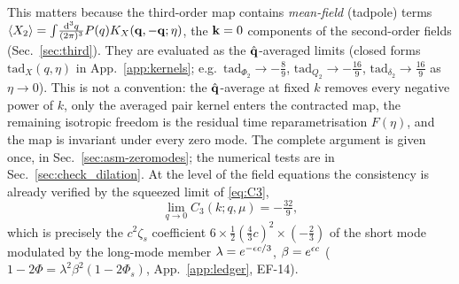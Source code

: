 This matters because the third-order map contains \emph{mean-field} (tadpole) terms
$\langle X_2\rangle=\int\!\frac{\mathrm d^3q}{(2\pi)^3}P(q)K_X(\mathbf q,-\mathbf q;\eta)$, the $\mathbf k=0$ components of the second-order fields (Sec.~\ref{sec:third}).  They are
evaluated as the $\hat{\mathbf q}$-averaged limits (closed forms $\mathrm{tad}_X(q,\eta)$ in App.~\ref{app:kernels}; e.g.\ $\mathrm{tad}_{\Phi_2}\to-\tfrac89$,
$\mathrm{tad}_{Q_2}\to-\tfrac{16}9$, $\mathrm{tad}_{\delta_2}\to\tfrac{16}9$ as $\eta\to0$).  This is not a convention: the $\hat{\mathbf q}$-average at fixed $k$
removes every negative power of $k$, only the averaged pair kernel enters the contracted map, the remaining isotropic freedom is the residual time
reparametrisation $F(\eta)$, and the map is invariant under every zero mode.  The complete argument is given once, in Sec.~\ref{sec:asm-zeromodes};
the numerical tests are in Sec.~\ref{sec:check_dilation}.
At the level of the field equations the consistency is already verified by the squeezed limit of \eqref{eq:C3},
\begin{equation}
\lim_{q\to0}C_3(k;q,\mu)=-\tfrac{32}9 ,
\end{equation}
which is precisely the $c^2\zeta_s$ coefficient $6\times\tfrac12(\tfrac43c)^2\times(-\tfrac23)$ of the short
mode modulated by the long-mode member $\lambda=e^{-\epsilon c/3}$, $\beta=e^{\epsilon c}$
($1-2\Phi=\lambda^2\beta^2(1-2\Phi_s)$, App.~\ref{app:ledger}, EF-14).
